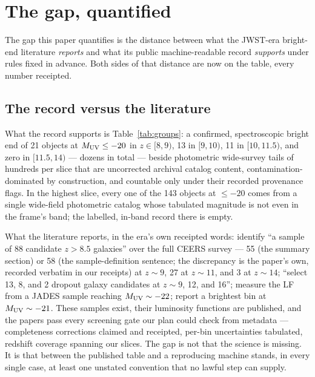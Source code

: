 \documentclass[twocolumn]{aastex702}
\begin{document}
\section{The gap, quantified} \label{sec:gap}

The gap this paper quantifies is the distance between what the JWST-era bright-end
literature \emph{reports} and what its public machine-readable record \emph{supports}
under rules fixed in advance. Both sides of that distance are now on the table, every
number receipted.

\subsection{The record versus the literature} \label{sec:gapcensus}

What the record supports is Table~\ref{tab:groups}: a confirmed, spectroscopic bright end
of 21 objects at $M_{\rm UV}\le-20$ in $z\in[8,9)$, 13 in $[9,10)$, 11 in $[10,11.5)$,
and zero in $[11.5,14)$ --- dozens in total --- beside photometric wide-survey tails of
hundreds per slice that are uncorrected archival catalog content, contamination-dominated
by construction, and countable only under their recorded provenance flags. In the
highest slice, every one of the 143 objects at $\le-20$ comes from a single wide-field
photometric catalog whose tabulated magnitude is not even in the frame's band; the
labelled, in-band record there is empty.

What the literature reports, in the era's own receipted words: \citet{finkelstein24}
identify ``a sample of 88 candidate $z>8.5$ galaxies'' over the full CEERS survey --- 55
(the summary section) or 58 (the sample-definition sentence; the discrepancy is the
paper's own, recorded verbatim in our receipts) at $z\sim9$, 27 at $z\sim11$, and 3 at
$z\sim14$; \citet{harikane23} ``select 13, 8, and 2 dropout galaxy candidates at
$z\sim9$, 12, and 16''; \citet{whitler25} measure the LF from a JADES sample reaching
$M_{\rm UV}\sim-22$; \citet{weibel26} report a brightest bin at $M_{\rm UV}\sim-21$.
These samples exist, their luminosity functions are published, and the papers pass every
screening gate our plan could check from metadata --- completeness corrections claimed
and receipted, per-bin uncertainties tabulated, redshift coverage spanning our slices.
The gap is not that the science is missing. It is that between the published table and a
reproducing machine stands, in every single case, at least one unstated convention that
no lawful step can supply.
\end{document}
